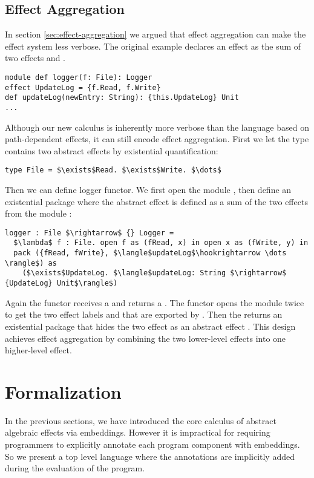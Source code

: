 \subsection{Effect Aggregation}
In section \ref{sec:effect-aggregation} we argued that effect aggregation can make the effect system less verbose. The original example declares an effect  as the sum of two effects  and . 
\begin{lstlisting}[xleftmargin=-5pt, numbers=none]
module def logger(f: File): Logger
effect UpdateLog = {f.Read, f.Write}
def updateLog(newEntry: String): {this.UpdateLog} Unit
...
\end{lstlisting}
Although our new calculus is inherently more verbose than the language based on path-dependent effects, it can still encode effect aggregation. First we let the  type contains two abstract effects by existential quantification:
\begin{lstlisting}[mathescape=true]
type File = $\exists$Read. $\exists$Write. $\dots$
\end{lstlisting}
Then we can define logger functor. We first open the module , then define an existential package where the abstract effect is defined as a sum of the two effects from the module :
\begin{lstlisting}[mathescape=true]
logger : File $\rightarrow$ {} Logger = 
  $\lambda$ f : File. open f as (fRead, x) in open x as (fWrite, y) in 
  pack ({fRead, fWrite}, $\langle$updateLog$\hookrightarrow \dots \rangle$) as 
    ($\exists$UpdateLog. $\langle$updateLog: String $\rightarrow$ {UpdateLog} Unit$\rangle$)
\end{lstlisting}
Again the functor  receives a  and returns a . The functor opens the  module twice to get the two effect labels  and  that are exported by . Then the  returns an existential package that hides the two effect as an abstract effect . This design achieves effect aggregation by combining the two lower-level effects into one higher-level effect.




\section{Formalization}
\label{sec-exist}
In the previous sections, we have introduced the core calculus of abstract algebraic effects via embeddings. However it is  impractical for requiring programmers to explicitly annotate each program component with embeddings. So we present a top level language where the annotations are implicitly added during the evaluation of the program.  

